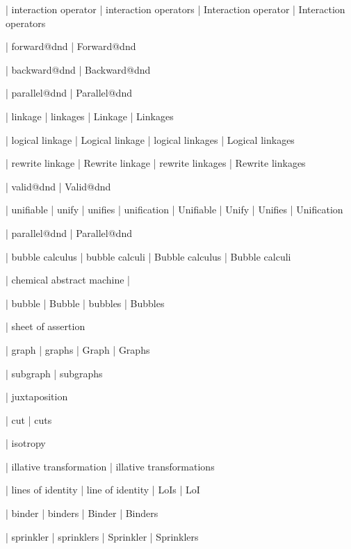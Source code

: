  | interaction operator
 | interaction operators
 | Interaction operator
 | Interaction operators

 | forward@dnd
 | Forward@dnd

 | backward@dnd
 | Backward@dnd

 | parallel@dnd
 | Parallel@dnd


 | linkage
 | linkages
 | Linkage
 | Linkages

 | logical linkage
 | Logical linkage
 | logical linkages
 | Logical linkages

 | rewrite linkage
 | Rewrite linkage
 | rewrite linkages
 | Rewrite linkages

 | valid@dnd
 | Valid@dnd

 | unifiable
 | unify
 | unifies
 | unification
 | Unifiable
 | Unify
 | Unifies
 | Unification

 | parallel@dnd
 | Parallel@dnd


 | bubble calculus
 | bubble calculi
 | Bubble calculus
 | Bubble calculi

 | chemical abstract machine
 | \cham

 | bubble
 | Bubble
 | bubbles
 | Bubbles


 | sheet of assertion
 
 | graph
 | graphs
 | Graph
 | Graphs

 | subgraph
 | subgraphs

 | juxtaposition

 | cut
 | cuts

 | isotropy

 | illative transformation
 | illative transformations

 | lines of identity
 | line of identity
 | LoIs
 | LoI

 | binder
 | binders
 | Binder
 | Binders

 | sprinkler
 | sprinklers
 | Sprinkler
 | Sprinklers

